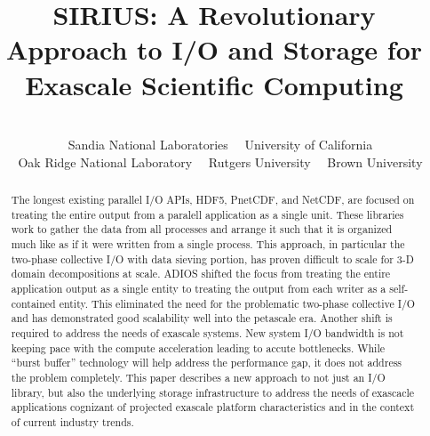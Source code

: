 \documentclass{sig-alt-gov2}
\begin{document}

\title{SIRIUS: A Revolutionary Approach to I/O and Storage for Exascale Scientific Computing}

\author{
\\
\footnotemark[1]~~Sandia National Laboratories
\footnotemark[2]~~University of California\\
\footnotemark[3]~~Oak Ridge National Laboratory
\footnotemark[4]~~Rutgers University
\footnotemark[5]~~Brown University\\
}
\maketitle

\begin{abstract}

The longest existing parallel I/O APIs, HDF5, PnetCDF, and NetCDF, are focused
on treating the entire output from a paralell application as a single unit.
These libraries work to gather the data from all processes and arrange it such
that it is organized much like as if it were written from a single process.
This approach, in particular the two-phase collective I/O with data sieving
portion, has proven difficult to scale for 3-D domain decompositions at scale.
ADIOS shifted the focus from treating the entire application output as a single
entity to treating the output from each writer as a self-contained entity. This
eliminated the need for the problematic two-phase collective I/O and has
demonstrated good scalability well into the petascale era. Another shift is
required to address the needs of exascale systems. New system I/O bandwidth is
not keeping pace with the compute acceleration leading to accute bottlenecks.
While ``burst buffer'' technology will help address the performance gap, it
does not address the problem completely. This paper describes a new approach
to not just an I/O library, but also the underlying storage infrastructure to
address the needs of exascacle applications cognizant of projected exascale
platform characteristics and in the context of current industry trends.

\end{abstract}
\end{document}
